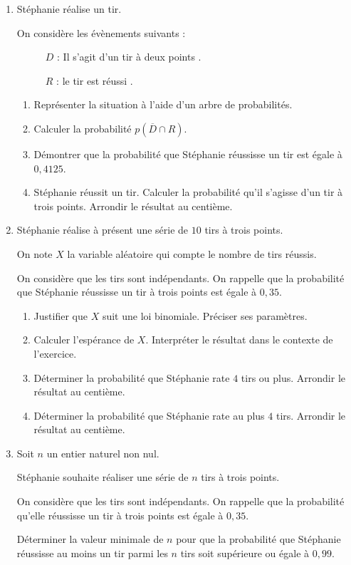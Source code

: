 \documentclass[10pt,a4paper]{article}
\begin{document}
\begin{enumerate}
\item Stéphanie réalise un tir.

On considère les évènements suivants :

\begin{description}
\item[ ] $D$ : \og Il s'agit d'un tir à deux points \fg.
\item[ ] $R$ : \og le tir est réussi \fg.
\end{description}
	\begin{enumerate}
		\item Représenter la situation à l'aide d'un arbre de probabilités.
		\item Calculer la probabilité $p\left(\overline{D} \cap R\right)$.
		\item Démontrer que la probabilité que Stéphanie réussisse un tir est égale à $0,4125$.
		\item Stéphanie réussit un tir. Calculer la probabilité qu'il s'agisse d'un tir à trois points. Arrondir le résultat au centième.
	\end{enumerate}	
\item Stéphanie réalise à présent une série de $10$ tirs à trois points.

On note $X$ la variable aléatoire qui compte le nombre de tirs réussis.

On considère que les tirs sont indépendants. On rappelle que la probabilité que Stéphanie réussisse un tir à trois points est égale à $0,35$.
	\begin{enumerate}
		\item Justifier que $X$ suit une loi binomiale. Préciser ses paramètres.
		\item Calculer l'espérance de $X$. Interpréter le résultat dans le contexte de l'exercice.
		\item Déterminer la probabilité que Stéphanie rate $4$ tirs ou plus. Arrondir le résultat au centième.
		\item Déterminer la probabilité que Stéphanie rate au plus $4$ tirs. Arrondir le résultat au centième.
	\end{enumerate}
\item Soit $n$ un entier naturel non nul.

Stéphanie souhaite réaliser une série de $n$ tirs à trois points.

On considère que les tirs sont indépendants. On rappelle que la probabilité qu'elle réussisse un tir à trois points est égale à $0,35$.

Déterminer la valeur minimale de $n$ pour que la probabilité que Stéphanie réussisse au moins un tir parmi les $n$ tirs soit supérieure ou égale à $0,99$.
\end{enumerate}
\end{document}
